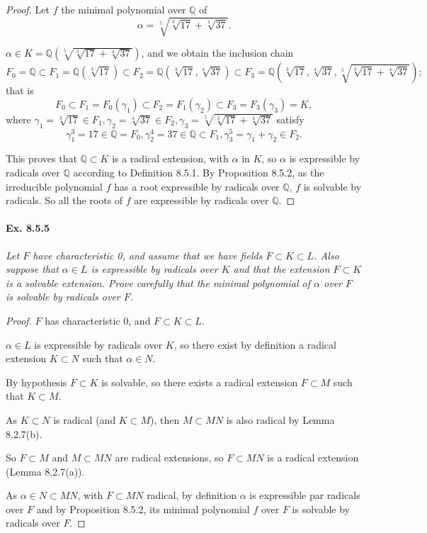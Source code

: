 \documentclass[11pt,a4paper]{article}
\newcommand{\Q}{\mathbb{Q}}
\begin{document}
\begin{proof}
Let $f$ the minimal polynomial over $\Q$ of 
$$\alpha = \sqrt[5]{\sqrt[3]{17} + \sqrt[4]{37}}.$$

$\alpha \in K = \Q( \sqrt[5]{\sqrt[3]{17} + \sqrt[4]{37}})$, and we obtain the inclusion chain
$$F_0 = \Q \subset F_1 = \Q(\sqrt[3]{17} ) \subset F_2 = \Q(\sqrt[3]{17}, \sqrt[4]{37}) \subset F_3 = \Q\left(\sqrt[3]{17}, \sqrt[4]{37}, \sqrt[5]{\sqrt[3]{17} + \sqrt[4]{37}}\right);$$
that is
$$F_0 \subset F_1=F_0(\gamma_1) \subset F_2 = F_1(\gamma_2) \subset F_3 = F_3(\gamma_3)=K,$$
where $\gamma_1 = \sqrt[3]{17} \in F_1,\gamma_2 = \sqrt[4]{37} \in F_2, \gamma_3 = \sqrt[5]{\sqrt[3]{17} + \sqrt[4]{37}}$ satisfy $$\gamma_1^3 = 17 \in \Q=F_0, \gamma_2^4 = 37 \in \Q \subset F_1, \gamma_3^5 = \gamma_1+\gamma_2 \in F_2.$$

This proves that $\Q \subset K$ is a radical extension, with $\alpha$ in $K$, so $\alpha$ is expressible by radicals over $\Q$ according to Definition 8.5.1. By Proposition 8.5.2, as the irreducible polynomial $f$ has a root expressible by radicals over $\Q$, $f$ is solvable by radicals. So all the roots of $f$ are expressible by radicals over $\Q$.
\end{proof}

\paragraph{Ex. 8.5.5}

{\it Let $F$ have characteristic 0, and assume that we have fields $F \subset K \subset L$. Also suppose that $\alpha \in L$ is expressible by radicals over $K$ and that the extension $F \subset K$ is a solvable extension. Prove carefully that the minimal polynomial of $\alpha$ over $F$ is solvable by radicals over $F$.
}

\begin{proof}
$F$ has characteristic 0, and $F \subset K \subset L$.

 $\alpha \in L$ is expressible by radicals over $K$, so there exist by definition a radical extension $K \subset N$ such that $\alpha\in N$. 
 
By hypothesis $F\subset K$ is solvable, so there exists a radical extension $F\subset M$ such that $K \subset M$.

As $K \subset N$ is radical (and $K \subset M$), then  $M \subset MN$ is also radical by Lemma 8.2.7(b).

So $F \subset M$ and $M \subset MN$ are radical extensions, so $F \subset MN$ is a radical extension (Lemma 8.2.7(a)).

As $\alpha \in N \subset MN$, with $F \subset MN$ radical, by definition $\alpha$ is expressible par radicals over $F$ and by Proposition 8.5.2, its minimal polynomial $f$ over $F$ is solvable by radicals over $F$.
\end{proof}
\end{document}
